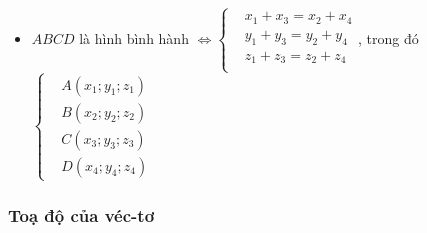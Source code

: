 \begin{itemize}
	\item $ABCD$ là hình bình hành $\Leftrightarrow \left\{\begin{aligned}
	&x_1+x_3=x_2+x_4\\
	&y_1+y_3=y_2+y_4\\
	&z_1+z_3=z_2+z_4\\
	\end{aligned}\right.$, trong đó $\left\{\begin{aligned}
	&A(x_1;y_1;z_1)\\
	&B(x_2;y_2;z_2)\\
	&C(x_3;y_3;z_3)\\
	&D(x_4;y_4;z_4)
	\end{aligned}\right.$
\end{itemize} 
\subsubsection{Toạ độ của véc-tơ}
